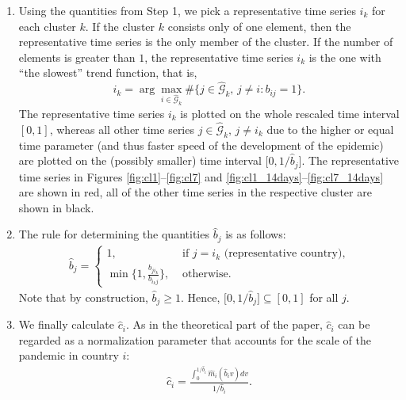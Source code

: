 \documentclass[a4paper,12pt]{article}
\numberwithin{equation}{section}
\begin{document}
\begin{enumerate}[label=\textit{Step \arabic*.},leftmargin=1.45cm]
\item Using the quantities from Step 1, we pick a representative time series $i_k$ for each cluster $k$. If the cluster $k$ consists only of one element, then the representative time series is the only member of the cluster. If the number of elements is greater than $1$, the representative time series $i_k$ is the one with ``the slowest'' trend function, that is, 
$$i_k = \arg \max_{i \in \hat{\mathcal{G}}_k} \# \{j \in \hat{\mathcal{G}}_k, \, j\neq i: b_{ij} = 1\}.$$
The representative time series $i_k$ is plotted on the whole rescaled time interval $[0, 1]$, whereas all other time series $j \in \hat{\mathcal{G}}_k,\, j \neq i_k$ due to the higher or equal time parameter (and thus faster speed of the development of the epidemic) are plotted on the (possibly smaller) time interval $\big[ 0, 1/\hat{b}_j \big]$. The representative time series in Figures \ref{fig:cl1}--\ref{fig:cl7} and \ref{fig:cl1_14days}--\ref{fig:cl7_14days} are shown in red, all of the other time series in the respective cluster are shown in black.


\item The rule for determining the quantities $\hat{b}_j$ is as follows:
\begin{align}\label{eq:b_hat}
\hat{b}_{j} = \begin{cases}
1, &\text{ if } j = i_k \text{ (representative country),}\\
\min \Big\{1, \frac{b_{j i_{k}}}{b_{i_k j}}\Big\},  &\text{ otherwise.}
\end{cases}
\end{align}
Note that by construction, $\hat{b}_j \geq 1$. Hence, $\big[ 0, 1/\hat{b}_j \big] \subseteq [0, 1]$ for all $j$.


\item We finally calculate $\hat{c}_i$. As in the theoretical part of the paper, $\hat{c}_i$ can be regarded as a normalization parameter that accounts for the scale of the pandemic in country $i$:
\begin{align}\label{eq:c_hat}
\hat{c}_{i} = \frac{\int_0^{1/\hat{b}_i} \hat{m}_i(\hat{b}_i v) dv}{1/\hat{b}_i}.
\end{align}


\end{enumerate}
\end{document}
